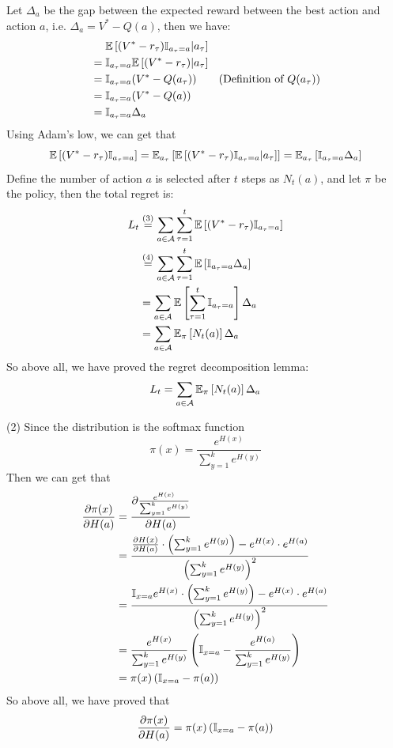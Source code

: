 Let $\Delta_a$ be the gap between the expected reward between the best action and action $a$, i.e. $\Delta_a = V^* - Q(a)$, then we have:
\begin{align*}
&\quad\ \mathbb{E}\left[(V^* - r_\tau)\mathbb{I}_{a_\tau = a} | a_\tau\right] \\
&= \mathbb{I}_{a_\tau = a}\mathbb{E}\left[(V^* - r_\tau) | a_\tau\right] \\
&= \mathbb{I}_{a_\tau = a}(V^* - Q(a_{\tau})) \qquad\text{(Definition of $Q(a_{\tau}$))} \\
&= \mathbb{I}_{a_\tau = a}(V^* - Q(a)) \\
&= \mathbb{I}_{a_\tau = a}\Delta_a
\end{align*}
Using Adam's low, we can get that
\begin{equation}
\mathbb{E}\left[(V^* - r_\tau)\mathbb{I}_{a_\tau = a}\right] = \mathbb{E}_{a_{\tau}}\left[\mathbb{E}\left[(V^* - r_\tau)\mathbb{I}_{a_\tau = a} | a_\tau\right]\right] = \mathbb{E}_{a_{\tau}}\left[\mathbb{I}_{a_\tau = a}\Delta_a\right]
\end{equation}
Define the number of action $a$ is selected after $t$ steps as $N_t(a)$, and let $\pi$ be the policy, then the total regret is:
\begin{align*}
L_t &\stackrel{(3)}{=} \sum_{a\in\mathcal{A}}\sum_{\tau=1}^{t}\mathbb{E}\left[(V^* - r_\tau)\mathbb{I}_{a_\tau = a}\right] \\
&\stackrel{(4)}{=} \sum_{a\in\mathcal{A}}\sum_{\tau=1}^{t}\mathbb{E}\left[\mathbb{I}_{a_\tau = a}\Delta_a\right] \\
&= \sum_{a\in\mathcal{A}}\mathbb{E}\left[\sum_{\tau=1}^{t}\mathbb{I}_{a_\tau = a}\right]\Delta_a \\
&= \sum_{a\in\mathcal{A}}\mathbb{E}_{\pi}\left[N_t(a)\right]\Delta_a
\end{align*}
So above all, we have proved the regret decomposition lemma:
$$L_t = \sum_{a\in\mathcal{A}}\mathbb{E}_{\pi}\left[N_t(a)\right]\Delta_a$$

(2) Since the distribution is the softmax function
$$\pi(x) = \dfrac{e^{H(x)}}{\sum_{y=1}^{k} e^{H(y)}}$$
Then we can get that
\begin{equation}
\begin{aligned}
\dfrac{\partial{\pi(x)}}{\partial{H(a)}} &= \dfrac{\partial{\frac{e^{H(x)}}{\sum_{y=1}^{k}{e^{H(y)}}}}}{\partial{H(a)}} \\
&= \dfrac{\frac{\partial{H(x)}}{\partial{H(a)}}\cdot\left(\sum_{y=1}^{k}{e^{H(y)}}\right) -e^{H(x)}\cdot e^{H(a)}}{\left(\sum_{y=1}^{k}{e^{H(y)}}\right)^2} \\
&= \dfrac{\mathbb{I}_{x=a}e^{H(x)}\cdot\left(\sum_{y=1}^{k}{e^{H(y)}}\right) -e^{H(x)}\cdot e^{H(a)}}{\left(\sum_{y=1}^{k}{e^{H(y)}}\right)^2} \\
&= \dfrac{e^{H(x)}}{\sum_{y=1}^{k}{e^{H(y)}}}\left(\mathbb{I}_{x=a} - \dfrac{e^{H(a)}}{\sum_{y=1}^{k}{e^{H(y)}}}\right) \\
&= \pi(x)\left(\mathbb{I}_{x=a} - \pi(a)\right)
\end{aligned}
\end{equation}
So above all, we have proved that
$$\dfrac{\partial{\pi(x)}}{\partial{H(a)}} = \pi(x)\left(\mathbb{I}_{x=a} - \pi(a)\right)$$

